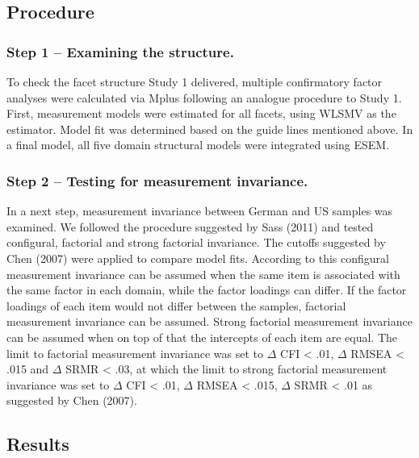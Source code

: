 \documentclass[,man,floatsintext]{apa6}
\begin{document}
\subsection{Procedure}\label{procedure-1}

\subsubsection{Step 1 -- Examining the
structure.}\label{step-1-examining-the-structure.}

To check the facet structure Study 1 delivered, multiple confirmatory
factor analyses were calculated via Mplus following an analogue
procedure to Study 1. First, measurement models were estimated for all
facets, using WLSMV as the estimator. Model fit was determined based on
the guide lines mentioned above. In a final model, all five domain
structural models were integrated using ESEM.

\subsubsection{Step 2 -- Testing for measurement
invariance.}\label{step-2-testing-for-measurement-invariance.}

In a next step, measurement invariance between German and US samples was
examined. We followed the procedure suggested by Sass (2011) and tested
configural, factorial and strong factorial invariance. The cutoffs
suggested by Chen (2007) were applied to compare model fits. According
to this configural measurement invariance can be assumed when the same
item is associated with the same factor in each domain, while the factor
loadings can differ. If the factor loadings of each item would not
differ between the samples, factorial measurement invariance can be
assumed. Strong factorial measurement invariance can be assumed when on
top of that the intercepts of each item are equal. The limit to
factorial measurement invariance was set to \(\Delta\) CFI \textless{}
.01, \(\Delta\) RMSEA \textless{} .015 and \(\Delta\) SRMR \textless{}
.03, at which the limit to strong factorial measurement invariance was
set to \(\Delta\) CFI \textless{} .01, \(\Delta\) RMSEA \textless{}
.015, \(\Delta\) SRMR \textless{} .01 as suggested by Chen (2007).

\subsection{Results}\label{results-1}
\end{document}
